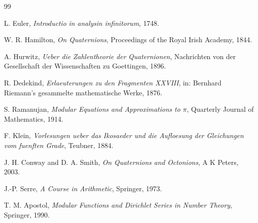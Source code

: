 \documentclass[11pt,a4paper]{article}
\theoremstyle{definition}
\theoremstyle{remark}
\begin{document}
\begin{thebibliography}{99}

L. Euler,
\emph{Introductio in analysin infinitorum}, 1748.

W. R. Hamilton,
\emph{On Quaternions}, Proceedings of the Royal Irish Academy, 1844.

A. Hurwitz,
\emph{Ueber die Zahlentheorie der Quaternionen}, Nachrichten von der Gesellschaft der Wissenschaften zu Goettingen, 1896.

R. Dedekind,
\emph{Erlaeuterungen zu den Fragmenten XXVIII}, in: Bernhard Riemann's gesammelte mathematische Werke, 1876.

S. Ramanujan,
\emph{Modular Equations and Approximations to \(\pi\)}, Quarterly Journal of Mathematics, 1914.

F. Klein,
\emph{Vorlesungen ueber das Ikosaeder und die Aufloesung der Gleichungen vom fuenften Grade}, Teubner, 1884.

J. H. Conway and D. A. Smith,
\emph{On Quaternions and Octonions}, A K Peters, 2003.

J.-P. Serre,
\emph{A Course in Arithmetic}, Springer, 1973.

T. M. Apostol,
\emph{Modular Functions and Dirichlet Series in Number Theory}, Springer, 1990.

\end{thebibliography}
\end{document}
